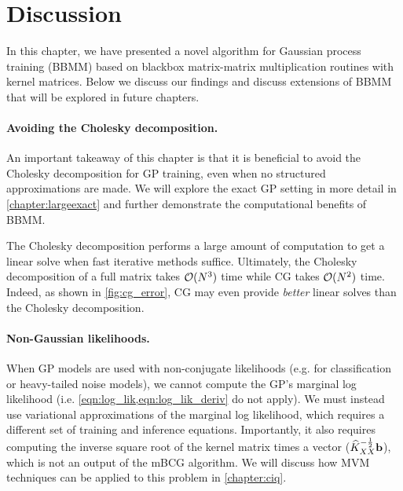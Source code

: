 \section{Discussion}
In this chapter, we have presented a novel algorithm for Gaussian process training (BBMM) based on blackbox matrix-matrix multiplication routines with kernel matrices.
Below we discuss our findings and discuss extensions of BBMM that will be explored in future chapters.

\paragraph{Avoiding the Cholesky decomposition.}
An important takeaway of this chapter is that it is beneficial to avoid the Cholesky decomposition for GP training, even when no structured approximations are made.
We will explore the exact GP setting in more detail in \cref{chapter:largeexact} and further demonstrate the computational benefits of BBMM.

The Cholesky decomposition performs a large amount of computation to get a linear solve when fast iterative methods suffice.
Ultimately, the Cholesky decomposition of a full matrix takes $\bigo{N^3}$ time while CG takes $\bigo{N^2}$ time.
Indeed, as shown in \cref{fig:cg_error}, CG may even provide \emph{better} linear solves than the Cholesky decomposition.

\paragraph{Non-Gaussian likelihoods.}
When GP models are used with non-conjugate likelihoods (e.g. for classification or heavy-tailed noise models), we cannot compute the GP's marginal log likelihood (i.e. \cref{eqn:log_lik,eqn:log_lik_deriv} do not apply).
We must instead use variational approximations of the marginal log likelihood, which requires a different set of training and inference equations.
Importantly, it also requires computing the inverse square root of the kernel matrix times a vector ($\widehat{K}_{XX}^{- \frac 1 2} \mathbf{b}$), which is not an output of the mBCG algorithm.
We will discuss how MVM techniques can be applied to this problem in \cref{chapter:ciq}.

